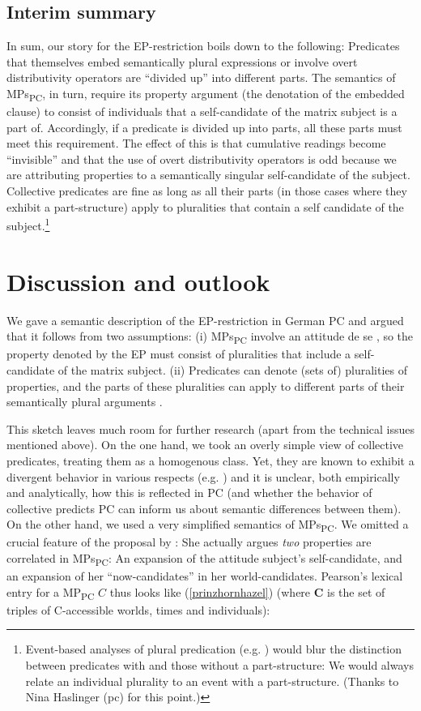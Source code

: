 \documentclass[output=paper]{langscibook}
\begin{document}
\subsection{Interim summary}

In sum, our story for the EP-restriction boils down to the following: Predicates that themselves embed semantically plural expressions or involve overt distributivity operators are “divided up” into different parts. The semantics of MPs\textsubscript{PC}, in turn, require its property argument (the denotation of the embedded clause) to consist of individuals that a self-candidate of the matrix subject is a part of. Accordingly, if a predicate is divided up into parts, all these parts must meet this requirement. The effect of this is that cumulative readings become “invisible” and that the use of overt distributivity operators is odd because we are attributing properties to a semantically singular self-candidate of the subject. Collective predicates are fine as long as all their parts (in those cases where they exhibit a part-structure) apply to pluralities that contain a self candidate of the subject.\footnote{Event-based analyses of plural predication (e.g. \citealt{Kratzer:2000}) would blur the distinction between predicates with and those without a part-structure: We would always relate an individual plurality to an event with a part-structure. (Thanks to Nina Haslinger (pc) for this point.)}

\section{Discussion and outlook}\label{prinzhornsec:5}

We gave a semantic description of the EP-restriction in German PC and argued that it follows from two assumptions: (i) MPs\textsubscript{PC} involve an attitude de se \citep{Pearson:2016}, so the property denoted by the EP must consist of pluralities that include a self-candidate of the matrix subject. (ii) Predicates can denote (sets of) pluralities of properties, and the parts of these pluralities can apply to different parts of their semantically plural arguments \citep{Haslinger:2018a,Haslinger:2018b}.

This sketch leaves much room for further research (apart from the technical issues mentioned above). On the one hand, we took an overly simple view of collective predicates, treating them as a homogenous class. Yet, they are known to exhibit a divergent behavior in various respects (e.g. \citealt{Dowty:1986, Landman:2000}) and it is unclear, both empirically and analytically, how this is reflected in PC (and whether the behavior of collective predicts PC can inform us about  semantic differences between them).
On the other hand,  we used a very simplified semantics of MPs\textsubscript{PC}. We omitted a crucial feature of the proposal by \citet{Pearson:2016}: She actually 
 argues \textit{two} properties are correlated in  MPs\textsubscript{PC}: An expansion of the attitude subject's self-candidate, and an expansion of her “now-candidates” in her world-candidates. Pearson's lexical entry for a MP\textsubscript{PC} $C$ thus looks like (\ref{prinzhornhazel}) (where \textbf{C} is the set of triples of C-accessible worlds, times and individuals):
\end{document}
